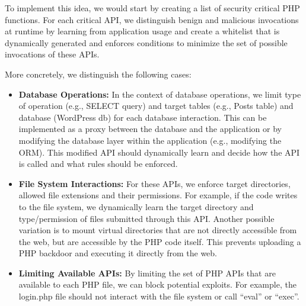 To implement this idea, we would start by creating a list of security critical PHP functions.
For each critical API, we distinguish benign and malicious invocations at runtime by learning from application usage and create a whitelist that is dynamically generated and enforces conditions to minimize the set of possible invocations of these APIs.

More concretely, we distinguish the following cases:
\begin{itemize}
  \item \textbf{Database Operations:} In the context of database operations, we limit type of operation (e.g., SELECT query) and target tables (e.g., Posts table) and database (WordPress db) for each database interaction. This can be implemented as a proxy between the database and the application or by modifying the database layer within the application (e.g., modifying the ORM). This modified API should dynamically learn and decide how the API is called and what rules should be enforced.
  \item \textbf{File System Interactions:} For these APIs, we enforce target directories, allowed file extensions and their permissions. For example, if the code writes to the file system, we dynamically learn the target directory and type/permission of files submitted through this API.
  Another possible variation is to mount virtual directories that are not directly accessible from the web, but are accessible by the PHP code itself. This prevents uploading a PHP backdoor and executing it directly from the web.
  \item \textbf{Limiting Available APIs:} By limiting the set of PHP APIs that are available to each PHP file, we can block potential exploits. For example, the login.php file should not interact with the file system or call ``eval'' or ``exec''.
\end{itemize}
